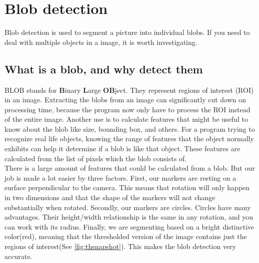 {\section{Blob detection}
Blob detection is used to segment a picture into individual blobs. If you need to deal with multiple objects in a image, it is worth investigating. 
\subsection{What is a blob, and why detect them}
BLOB stands for \textbf{B}inary \textbf{L}arge \textbf{OB}ject. They represent regions of interest (ROI) in an image. Extracting the blobs from an image can significantly cut down on processing time, because the program now only have to process the ROI instead of the entire image. Another use is to calculate features that might be useful to know about the blob like size, bounding box, and others. For a program trying to recognize real life objects, knowing the range of features that the object normally exhibits can help it determine if a blob is like that object. These features are calculated from the list of pixels which the blob consists of.\\

There is a large amount of features that could be calculated from a blob. But our job is made a lot easier by three factors. First, our markers are resting on a surface perpendicular to the camera. This means that rotation will only happen in two dimensions and that the shape of the markers will not change substantially when rotated. Secondly, our markers are circles. Circles have many advantages. Their height/width relationship is the same in any rotation, and you can work with its radius. Finally, we are segmenting based on a bright distinctive color(red), meaning that the thresholded version of the image contains just the regions of interest(See \autoref{fig:thsnapshot}). This makes the blob detection very accurate.
}
